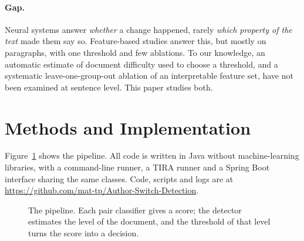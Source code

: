 \documentclass[runningheads]{llncs}
\begin{document}
\paragraph{Gap.} Neural systems answer \emph{whether} a change happened, rarely \emph{which property of the text} made them say so. Feature-based studies answer this, but mostly on paragraphs, with one threshold and few ablations. To our knowledge, an automatic estimate of document difficulty used to choose a threshold, and a systematic leave-one-group-out ablation of an interpretable feature set, have not been examined at sentence level. This paper studies both.

\section{Methods and Implementation}
\label{sec:methods}

Figure~\ref{fig:pipeline} shows the pipeline. All code is written in Java without machine-learning libraries, with a command-line runner, a TIRA runner and a Spring Boot interface sharing the same classes. Code, scripts and logs are at \url{https://github.com/mat-tp/Author-Switch-Detection}.

\begin{figure}[t]
\centering
{}
\caption{The pipeline. Each pair classifier gives a score; the detector estimates the level of the document, and the threshold of that level turns the score into a decision.}
\label{fig:pipeline}
\end{figure}
\end{document}
